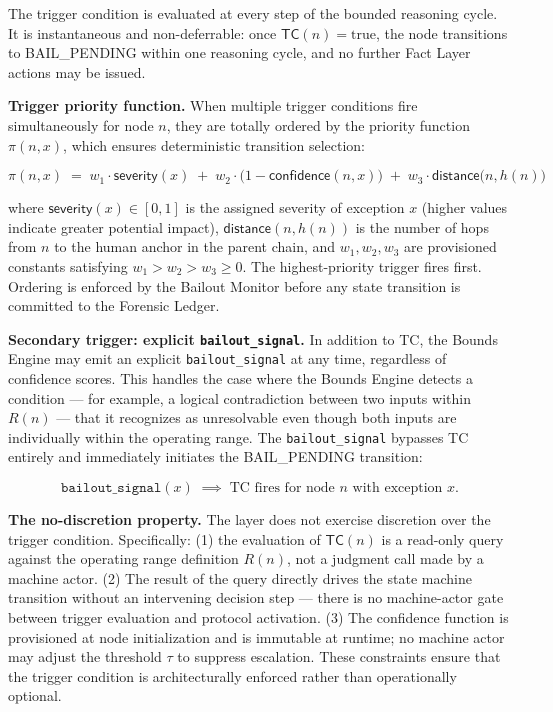 The trigger condition is evaluated at every step of the bounded reasoning cycle. It is instantaneous and non-deferrable: once $\mathsf{TC}(n) = \text{true}$, the node transitions to BAIL\_PENDING within one reasoning cycle, and no further Fact Layer actions may be issued.

\bigskip
\noindent\textbf{Trigger priority function.} When multiple trigger conditions fire simultaneously for node $n$, they are totally ordered by the priority function $\pi(n, x)$, which ensures deterministic transition selection:

\[
\pi(n, x) \;=\; w_1 \cdot \mathsf{severity}(x) \;+\; w_2 \cdot \bigl(1 - \mathsf{confidence}(n, x)\bigr) \;+\; w_3 \cdot \mathsf{distance}\bigl(n, h(n)\bigr) \tag{PF}
\]

where $\mathsf{severity}(x) \in [0, 1]$ is the assigned severity of exception $x$ (higher values indicate greater potential impact), $\mathsf{distance}(n, h(n))$ is the number of hops from $n$ to the human anchor in the parent chain, and $w_1, w_2, w_3$ are provisioned constants satisfying $w_1 > w_2 > w_3 \geq 0$. The highest-priority trigger fires first. Ordering is enforced by the Bailout Monitor before any state transition is committed to the Forensic Ledger.

\bigskip
\noindent\textbf{Secondary trigger: explicit \texttt{bailout\_signal}.} In addition to TC, the Bounds Engine may emit an explicit \texttt{bailout\_signal} at any time, regardless of confidence scores. This handles the case where the Bounds Engine detects a condition — for example, a logical contradiction between two inputs within $R(n)$ — that it recognizes as unresolvable even though both inputs are individually within the operating range. The \texttt{bailout\_signal} bypasses TC entirely and immediately initiates the BAIL\_PENDING transition:

\[
\texttt{bailout\_signal}(x) \;\implies\; \text{TC fires for node } n \text{ with exception } x. \tag{TC-secondary}
\]

\bigskip
\noindent\textbf{The no-discretion property.} The \bounds{} layer does not exercise discretion over the trigger condition. Specifically: (1) the evaluation of $\mathsf{TC}(n)$ is a read-only query against the operating range definition $R(n)$, not a judgment call made by a machine actor. (2) The result of the query directly drives the state machine transition without an intervening decision step — there is no machine-actor gate between trigger evaluation and protocol activation. (3) The confidence function is provisioned at node initialization and is immutable at runtime; no machine actor may adjust the threshold $\tau$ to suppress escalation. These constraints ensure that the trigger condition is architecturally enforced rather than operationally optional.

